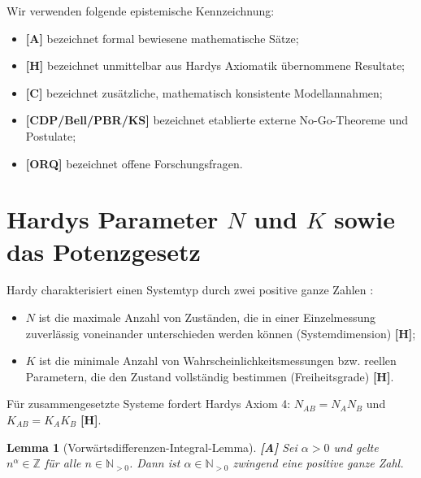 \documentclass[11pt,a4paper,reqno]{amsart}
\newtheorem{lemma}[theorem]{Lemma}
\theoremstyle{definition}
\theoremstyle{remark}
\begin{document}
	Wir verwenden folgende epistemische Kennzeichnung:
	\begin{itemize}
		\item \textbf{[A]} bezeichnet formal bewiesene mathematische S\"atze;
		\item \textbf{[H]} bezeichnet unmittelbar aus Hardys Axiomatik \cite{Hardy2001} \"ubernommene Resultate;
		\item \textbf{[C]} bezeichnet zus\"atzliche, mathematisch konsistente Modellannahmen;
		\item \textbf{[CDP/Bell/PBR/KS]} bezeichnet etablierte externe No-Go-Theoreme und Postulate;
		\item \textbf{[ORQ]} bezeichnet offene Forschungsfragen.
	\end{itemize}
	
	\section{Hardys Parameter $N$ und $K$ sowie das Potenzgesetz}
	
	Hardy charakterisiert einen Systemtyp durch zwei positive ganze Zahlen \cite{Hardy2001}:
	\begin{itemize}
		\item $N$ ist die maximale Anzahl von Zust\"anden, die in einer Einzelmessung zuverl\"assig voneinander unterschieden werden k\"onnen (Systemdimension) \textbf{[H]};
		\item $K$ ist die minimale Anzahl von Wahrscheinlichkeitsmessungen bzw. reellen Parametern, die den Zustand vollst\"andig bestimmen (Freiheitsgrade) \textbf{[H]}.
	\end{itemize}
	
	F\"ur zusammengesetzte Systeme fordert Hardys Axiom 4: $N_{AB} = N_A N_B$ und $K_{AB} = K_A K_B$ \textbf{[H]}.
	
	\begin{lemma}[Vorw\"artsdifferenzen-Integral-Lemma] \textbf{[A]}
		\label{lem:integral_diff}
		Sei $\alpha > 0$ und gelte $n^\alpha \in \mathbb{Z}$ f\"ur alle $n \in \mathbb{N}_{>0}$. Dann ist $\alpha \in \mathbb{N}_{>0}$ zwingend eine positive ganze Zahl.
	\end{lemma}
	
\end{document}

